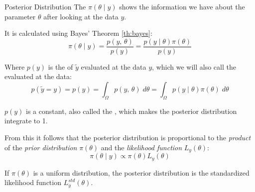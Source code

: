 \begin{definition}{Posterior Distribution}{}{}
    The  $\pi(\theta \mid y)$ shows the information we have
	about the parameter $\theta$ after looking at the data $y$.

	It is calculated using Bayes' Theorem \ref{th:bayes}:
	\begin{equation}
		\pi(\theta \mid y) = \frac{p(y,\,\theta)}{p(y)} = \frac{p(y \mid \theta) \pi(\theta)}{p(y)}
	\end{equation}

	Where $p(y)$ is the  of $\tilde{y}$ evaluated at the
	data $y$, which we will also call the  evaluated at
	the data:
	\begin{equation}
		p(\tilde y = y) = p(y) = \int_{\Omega} p(y,\,\theta) \;d\theta = \int_{\Omega} p(y \mid \theta) \pi(\theta) \;d\theta
	\end{equation}

	\begin{note}
		$p(y)$ is a constant, also called the , which
		makes the posterior distribution integrate to 1.
	\end{note}

	From this it follows that the posterior distribution is proportional to the
	\emph{product} of the \emph{prior distribution} $\pi(\theta)$ and the
	\emph{likelihood function} $L_y(\theta)$:
	\begin{equation}
		\pi(\theta \mid y) \propto \pi(\theta) L_y(\theta)
	\end{equation}
\end{definition}

\begin{note}
	If $\pi(\theta)$ is a uniform distribution, the posterior distribution is the
	standardized likelihood function $L_y^{std}(\theta)$.
\end{note}

